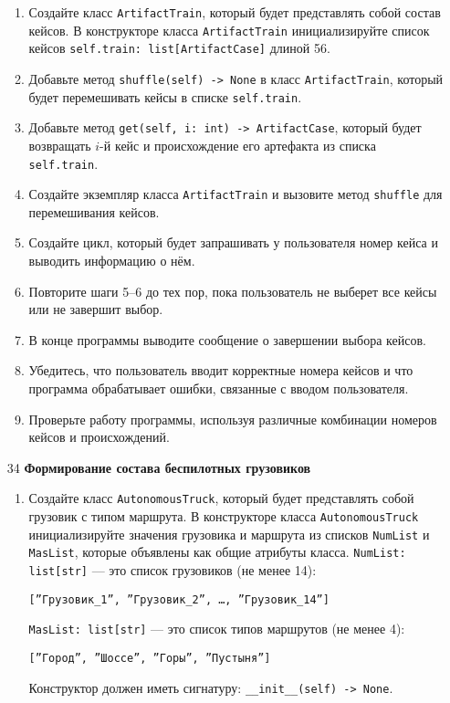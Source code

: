 \begin{enumerate}
\begin{enumerate}
    \item Создайте класс \texttt{ArtifactTrain}, который будет представлять собой состав кейсов. В конструкторе класса \texttt{ArtifactTrain} инициализируйте список кейсов \texttt{self.train: list[ArtifactCase]} длиной 56.

    \item Добавьте метод \texttt{shuffle(self) -> None} в класс \texttt{ArtifactTrain}, который будет перемешивать кейсы в списке \texttt{self.train}.

    \item Добавьте метод \texttt{get(self, i: int) -> ArtifactCase}, который будет возвращать $i$-й кейс и происхождение его артефакта из списка \texttt{self.train}.

    \item Создайте экземпляр класса \texttt{ArtifactTrain} и вызовите метод \texttt{shuffle} для перемешивания кейсов.

    \item Создайте цикл, который будет запрашивать у пользователя номер кейса и выводить информацию о нём.

    \item Повторите шаги 5–6 до тех пор, пока пользователь не выберет все кейсы или не завершит выбор.

    \item В конце программы выводите сообщение о завершении выбора кейсов.

    \item Убедитесь, что пользователь вводит корректные номера кейсов и что программа обрабатывает ошибки, связанные с вводом пользователя.

    \item Проверьте работу программы, используя различные комбинации номеров кейсов и происхождений.
\end{enumerate}

\item[34] \textbf{Формирование состава беспилотных грузовиков}
\begin{enumerate}
    \item Создайте класс \texttt{AutonomousTruck}, который будет представлять собой грузовик с типом маршрута. В конструкторе класса \texttt{AutonomousTruck} инициализируйте значения грузовика и маршрута из списков \texttt{NumList} и \texttt{MasList}, которые объявлены как общие атрибуты класса. \texttt{NumList: list[str]} — это список грузовиков (не менее 14): 
    \begin{center}
        \texttt{[''Грузовик\_1'', ''Грузовик\_2'', \dots, ''Грузовик\_14'']}
    \end{center}
    \texttt{MasList: list[str]} — это список типов маршрутов (не менее 4):
    \begin{center}
        \texttt{[''Город'', ''Шоссе'', ''Горы'', ''Пустыня'']}
    \end{center}
    Конструктор должен иметь сигнатуру: \texttt{\_\_init\_\_(self) -> None}.


\end{enumerate}
\end{enumerate}
